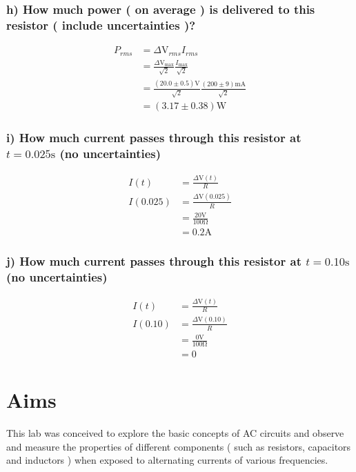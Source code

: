 \documentclass{report}
\begin{document}
\subsection*{h) How much power ( on average ) is delivered to this resistor ( include uncertainties )?}
    \begin{align}
        P_{rms}&=\Delta\si{\volt}_{rms}I_{rms}\nonumber\\
               &=\frac{\Delta\si{\volt}_{\max}}{\sqrt{2}}\frac{I_{\max}}{\sqrt{2}}\nonumber\\
               &=\frac{(20.0\pm0.5)\si{\volt}}{\sqrt{2}}\frac{(200\pm9)\si{\milli\ampere}}{\sqrt{2}}\nonumber\\
               &=(3.17\pm0.38)\si{\watt}
    \end{align}

\subsection*{i) How much current passes through this resistor at $t = 0.025\si{\second}$ (no uncertainties) }
    \begin{align}
        I(t)&=\frac{\Delta\si{\volt}(t)}{R}\nonumber\\
        I(0.025)&=\frac{\Delta\si{\volt}(0.025)}{R}\nonumber\\
        &=\frac{20\si{\volt}}{100\si{\ohm}}\nonumber\\
        &=0.2\si{\ampere}
    \end{align}

\subsection*{j) How much current passes through this resistor at $t = 0.10\si{\second}$ (no uncertainties) }
    \begin{align}
        I(t)&=\frac{\Delta\si{\volt}(t)}{R}\nonumber\\
        I(0.10)&=\frac{\Delta\si{\volt}(0.10)}{R}\nonumber\\
        &=\frac{0\si{\volt}}{100\si{\ohm}}\nonumber\\
        &=0
    \end{align}

\chapter{Aims}

This lab was conceived to explore the basic concepts of AC circuits and observe and measure the properties of different components ( such as resistors, capacitors and inductors ) when exposed to alternating currents of various frequencies. 
\end{document}
